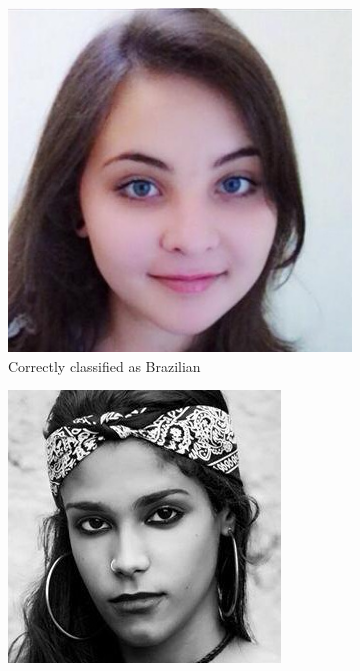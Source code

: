 \begin{figure}[!htb]
    \centering
    \begin{subfigure}[t]{0.3\textwidth}
      \includegraphics[width=\textwidth]{figures/results/misclassification/brazil-brazil.jpg}
      \caption{Correctly classified as Brazilian}
    \end{subfigure}
    \begin{subfigure}[t]{0.3\textwidth}
      \includegraphics[width=\textwidth]{figures/results/misclassification/brazil-india.jpg}

\end{subfigure}
\end{figure}
